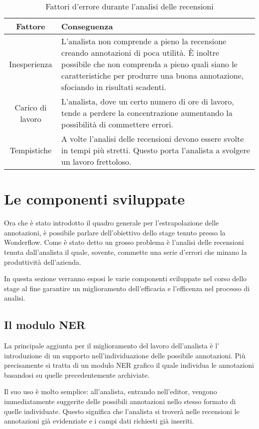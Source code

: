 \begin{table}[ht]
\begin{center}
\begin{tabular}{|c|p{10cm}|}
\hline
\textbf{Fattore} & \textbf{Conseguenza} \\ \hline
Inesperienza &
L'analista non comprende a pieno la recensione creando annotazioni di poca
utilità. È inoltre possibile che non comprenda a pieno quali siano le
caratteristiche per produrre una buona annotazione, sfociando in risultati
scadenti. \\ \hline
Carico di lavoro &
L'analista, dove un certo numero di ore di lavoro, tende a perdere la
concentrazione aumentando la possibilità di commettere errori. \\ \hline
Tempistiche &
A volte l'analisi delle recensioni devono essere svolte in tempi più stretti.
Questo porta l'analista a svolgere un lavoro frettoloso.
\\ \hline
\end{tabular}
\end{center}
\caption{Fattori d'errore durante l'analisi delle recensioni}
\label{tab:fattori_errore}
\end{table}

\section{Le componenti sviluppate}
Ora che è stato introdotto il quadro generale per l'estrapolazione delle
annotazioni, è possibile parlare dell'obiettivo dello stage tenuto presso 
la Wonderflow. Come è stato detto un grosso problema è l'analisi
delle recensioni tenuta dall'analista il quale, sovente, commette una serie
d'errori che minano la produttività dell'azienda.

In questa sezione verranno esposi le varie componenti sviluppate nel corso dello
stage al fine garantire un miglioramento dell'efficacia e l'efficenza nel 
processo di analisi.

\subsection{Il modulo NER}
La principale aggiunta per il miglioramento del lavoro dell'analista è l'
introduzione di un supporto nell'individuazione delle possibile annotazioni. 
Più precisamente si tratta di un modulo \gls{NER} grafico il quale individua 
le annotazioni basandosi su quelle precedentemente archiviate.

Il suo uso è molto semplice: all'analista, entrando nell'editor, vengono
immediatamente suggerite delle possibili annotazioni nello stesso formato di
quelle individuate. Questo significa che l'analista si troverà nelle recensioni
le annotazioni già evidenziate e i campi dati richiesti già inseriti.

